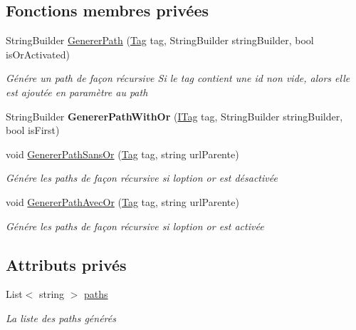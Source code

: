 \subsection*{Fonctions membres privées}
\begin{DoxyCompactItemize}
\item 
String\+Builder \mbox{\hyperlink{class_m_t_connect_agent_1_1_b_l_l_1_1_m_t_connect_client_ad38815a224cb788630db2a3eb09d84c7}{Generer\+Path}} (\mbox{\hyperlink{class_m_t_connect_agent_1_1_model_1_1_tag}{Tag}} tag, String\+Builder string\+Builder, bool is\+Or\+Activated)
\begin{DoxyCompactList}\small\item\em Génére un path de façon récursive Si le tag contient une id non vide, alors elle est ajoutée en paramètre au path \end{DoxyCompactList}\item 
\mbox{\label{class_m_t_connect_agent_1_1_b_l_l_1_1_m_t_connect_client_ae62829c685da54c7761cb892d292d190}} 
String\+Builder {\bfseries Generer\+Path\+With\+Or} (\mbox{\hyperlink{interface_m_t_connect_agent_1_1_model_1_1_i_tag}{I\+Tag}} tag, String\+Builder string\+Builder, bool is\+First)
\item 
void \mbox{\hyperlink{class_m_t_connect_agent_1_1_b_l_l_1_1_m_t_connect_client_a49be318d688f99f3fe6596c74eba7ca1}{Generer\+Path\+Sans\+Or}} (\mbox{\hyperlink{class_m_t_connect_agent_1_1_model_1_1_tag}{Tag}} tag, string url\+Parente)
\begin{DoxyCompactList}\small\item\em Génére les paths de façon récursive si l\textquotesingle{}option or est désactivée \end{DoxyCompactList}\item 
void \mbox{\hyperlink{class_m_t_connect_agent_1_1_b_l_l_1_1_m_t_connect_client_a7e6917938b6629de25db52ed84dba6c5}{Generer\+Path\+Avec\+Or}} (\mbox{\hyperlink{class_m_t_connect_agent_1_1_model_1_1_tag}{Tag}} tag, string url\+Parente)
\begin{DoxyCompactList}\small\item\em Génére les paths de façon récursive si l\textquotesingle{}option or est activée \end{DoxyCompactList}\end{DoxyCompactItemize}
\subsection*{Attributs privés}
\begin{DoxyCompactItemize}
\item 
List$<$ string $>$ \mbox{\hyperlink{class_m_t_connect_agent_1_1_b_l_l_1_1_m_t_connect_client_ad1f188c1a4cd646e7630866643045d34}{paths}}
\begin{DoxyCompactList}\small\item\em La liste des paths générés \end{DoxyCompactList}\end{DoxyCompactItemize}


